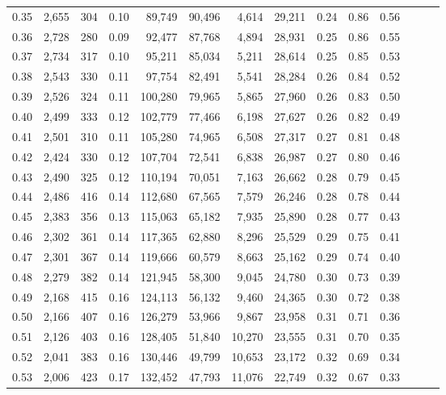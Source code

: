 \begin{tabular}{rrrrrrrrrrrrrr}
0.35 &  2,655 &  304 &  0.10 &   89,749 &   90,496 &   4,614 &  29,211 &  0.24 &  0.86 &      0.56 \\
0.36 &  2,728 &  280 &  0.09 &   92,477 &   87,768 &   4,894 &  28,931 &  0.25 &  0.86 &      0.55 \\
0.37 &  2,734 &  317 &  0.10 &   95,211 &   85,034 &   5,211 &  28,614 &  0.25 &  0.85 &      0.53 \\
0.38 &  2,543 &  330 &  0.11 &   97,754 &   82,491 &   5,541 &  28,284 &  0.26 &  0.84 &      0.52 \\
0.39 &  2,526 &  324 &  0.11 &  100,280 &   79,965 &   5,865 &  27,960 &  0.26 &  0.83 &      0.50 \\
0.40 &  2,499 &  333 &  0.12 &  102,779 &   77,466 &   6,198 &  27,627 &  0.26 &  0.82 &      0.49 \\
0.41 &  2,501 &  310 &  0.11 &  105,280 &   74,965 &   6,508 &  27,317 &  0.27 &  0.81 &      0.48 \\
0.42 &  2,424 &  330 &  0.12 &  107,704 &   72,541 &   6,838 &  26,987 &  0.27 &  0.80 &      0.46 \\
0.43 &  2,490 &  325 &  0.12 &  110,194 &   70,051 &   7,163 &  26,662 &  0.28 &  0.79 &      0.45 \\
0.44 &  2,486 &  416 &  0.14 &  112,680 &   67,565 &   7,579 &  26,246 &  0.28 &  0.78 &      0.44 \\
0.45 &  2,383 &  356 &  0.13 &  115,063 &   65,182 &   7,935 &  25,890 &  0.28 &  0.77 &      0.43 \\
0.46 &  2,302 &  361 &  0.14 &  117,365 &   62,880 &   8,296 &  25,529 &  0.29 &  0.75 &      0.41 \\
0.47 &  2,301 &  367 &  0.14 &  119,666 &   60,579 &   8,663 &  25,162 &  0.29 &  0.74 &      0.40 \\
0.48 &  2,279 &  382 &  0.14 &  121,945 &   58,300 &   9,045 &  24,780 &  0.30 &  0.73 &      0.39 \\
0.49 &  2,168 &  415 &  0.16 &  124,113 &   56,132 &   9,460 &  24,365 &  0.30 &  0.72 &      0.38 \\
0.50 &  2,166 &  407 &  0.16 &  126,279 &   53,966 &   9,867 &  23,958 &  0.31 &  0.71 &      0.36 \\
0.51 &  2,126 &  403 &  0.16 &  128,405 &   51,840 &  10,270 &  23,555 &  0.31 &  0.70 &      0.35 \\
0.52 &  2,041 &  383 &  0.16 &  130,446 &   49,799 &  10,653 &  23,172 &  0.32 &  0.69 &      0.34 \\
0.53 &  2,006 &  423 &  0.17 &  132,452 &   47,793 &  11,076 &  22,749 &  0.32 &  0.67 &      0.33 \\

\end{tabular}
